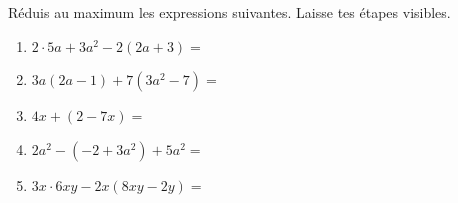 %
%
    Réduis au maximum les expressions suivantes. Laisse tes étapes visibles.
    \begin{enumerate}[itemsep=4cm]
        \item \(2\cdot 5a + 3a^2 - 2(2a+3)=\)
        \item \(3a(2a-1) + 7(3a^2 - 7)=\)
        \item \(4x + (2 - 7x) = \)
        \item \(2a^2 - (-2 + 3a^2) + 5a^2 =\)
        \item \(3x \cdot 6xy - 2x (8xy - 2y)=\)
    \end{enumerate}
